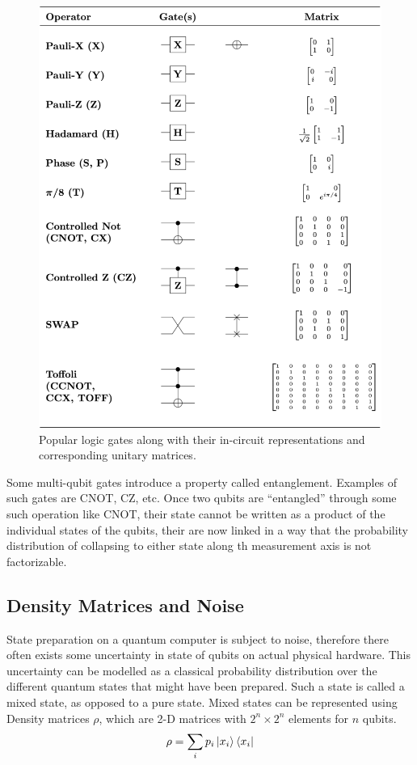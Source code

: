 \begin{figure}[h]
    \centering
    \includegraphics[width=0.7\linewidth]{figures/quantum/quantum_logic_gates.png}
    \caption{Popular logic gates along with their in-circuit representations and corresponding unitary matrices.}
    \label{fig:quantum-unitary-gates}
\end{figure}

Some multi-qubit gates introduce a property called entanglement. Examples of such gates are CNOT, CZ, etc. Once two qubits are ``entangled'' through some such operation like CNOT, their state cannot be written as a product of the individual states of the qubits, their are now linked in a way that the probability distribution of collapsing to either state along th measurement axis is not factorizable. 


\subsection{Density Matrices and Noise}

State preparation on a quantum computer is subject to noise, therefore there often exists some uncertainty in state of qubits on actual physical hardware. This uncertainty can be modelled as a classical probability distribution over the different quantum states that might have been prepared. Such a state is called a mixed state, as opposed to a pure state. Mixed states can be represented using Density matrices $\rho$, which are 2-D matrices with $2^n \times 2^n$ elements for $n$ qubits.
\begin{equation}
    \rho = \sum_{i} p_i \ket{x_i} \bra{x_i}
\end{equation}


